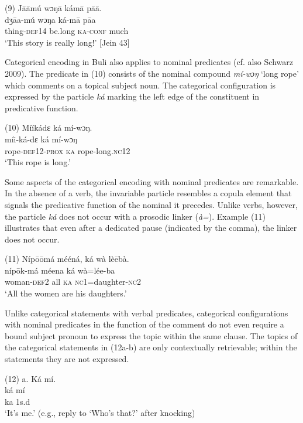 \documentclass[output=paper]{langsci/langscibook}
\begin{document}
\gll \textup{(9)}  J\={a}\={a}mú    wɔŋ\={a}    kám\={a}    p\={a}\={a}.\\
\gll \textup{dʒ\={a}a-mú  wɔŋa    ká-m\={a}    p\={a}a}\\
     thing-\textsc{def}14  be.long  \textsc{ka}{}-\textsc{conf}  much\\
\glt ‘This story is really long!’ [Jein 43]
\z

Categorical encoding in Buli also applies to nominal predicates (cf. also Schwarz 2009). The predicate in (10) consists of the nominal compound \textit{mí-wɔŋ}\textit{}‘long rope’ which comments on a topical subject noun. The categorical configuration is expressed by the particle \textit{ká} marking the left edge of the constituent in predicative function. 

\gll \textup{(10)  }Mííkádɛ    ká  mí-wɔŋ.\\
\gll \textup{  míi-ká-dɛ    ká  mí-wɔŋ}\\
       rope-\textsc{def}12-\textsc{prox}  \textsc{ka}  rope-long.\textsc{nc}12\\
\glt ‘This rope is long.’ \citep[267]{Schwarz2009}
\z

Some aspects of the categorical encoding with nominal predicates are remarkable. In the absence of a verb, the invariable particle resembles a copula element that signals the predicative function of the nominal it precedes. Unlike verbs, however, the particle \textit{ká }does not occur with a prosodic linker (\textit{à=}). Example (11) illustrates that even after a dedicated pause (indicated by the comma), the linker does not occur.

\gll \textup{(11)}  \textup{Níp\={o}\={o}má  mééná,    ká  wà  lè\={e}bà.}\\
\gll \textup{  níp\={o}k-má  méena    ká  wà=lée-ba}\\
       woman-\textsc{def}2  all    \textsc{ka}  \textsc{nc}1=daughter-\textsc{nc}2\\
\glt ‘All the women are his daughters.’ \citep[268]{Schwarz2009}
\z

Unlike categorical statements with verbal predicates, categorical configurations with nominal predicates in the function of the comment do not even require a bound subject pronoun to express the topic within the same clause. The topics of the categorical statements in (12a-b) are only contextually retrievable; within the statements they are not expressed.     

\gll \textup{(12)}  \textup{a.}  Ká  mí.\\
\gll \textup{ká  mí}\\
     ka  1s.d\\
\glt   ‘It’s me.’ (e.g., reply to ‘Who’s that?’ after knocking) \citep[269]{Schwarz2009}
\z
\end{document}
